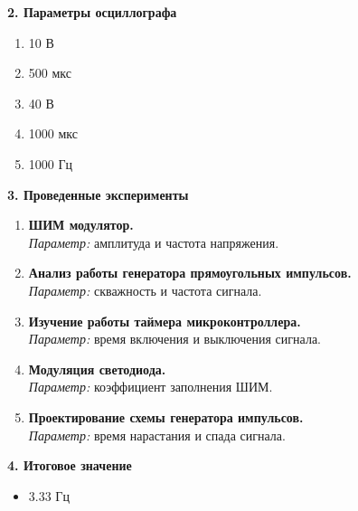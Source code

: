 \textbf{2. Параметры осциллографа}
\begin{enumerate}
    \item 10 В
    \item 500 мкс
    \item 40 В
    \item 1000 мкс
    \item 1000 Гц
\end{enumerate}

\vspace{1em}

\textbf{3. Проведенные эксперименты}
\begin{enumerate}
    \item \textbf{ШИМ модулятор.} \\
    \textit{Параметр:} амплитуда и частота напряжения.
    
    \item \textbf{Анализ работы генератора прямоугольных импульсов.} \\
    \textit{Параметр:} скважность и частота сигнала.
    
    \item \textbf{Изучение работы таймера микроконтроллера.} \\
    \textit{Параметр:} время включения и выключения сигнала.
    
    \item \textbf{Модуляция светодиода.} \\
    \textit{Параметр:} коэффициент заполнения ШИМ.
    
    \item \textbf{Проектирование схемы генератора импульсов.} \\
    \textit{Параметр:} время нарастания и спада сигнала.
\end{enumerate}

\vspace{1em}

\textbf{4. Итоговое значение}
\begin{itemize}
    \item 3.33 Гц
\end{itemize}

\newpage